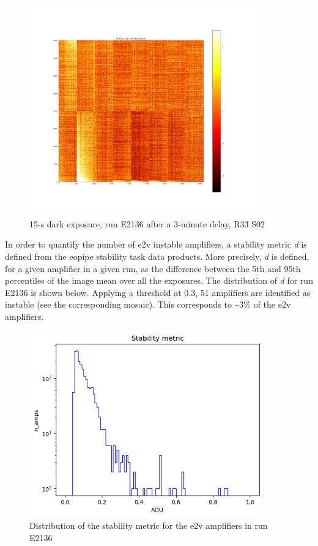 \begin{figure}
\begin{centering}
\includegraphics[width=0.9\textwidth]{sections/figures/E2136_dark15_delay_R33_S02.png}
\end{centering}
\caption{15-s dark exposure, run E2136 after a 3-minute delay, R33 S02}
\end{figure}

In order to quantify the number of e2v instable amplifiers, a stability
metric \emph{d} is defined from the eo\label{pipe}{pipe}
stability task data products. More precisely, \emph{d} is defined, for a
given amplifier in a given run, as the difference between the 5th and
95th percentiles of the image mean over all the exposures. The
distribution of \emph{d} for run E2136 is shown below. Applying a
threshold at 0.3, 51 amplifiers are identified as instable (see the
corresponding mosaic). This corresponds to \textasciitilde3\% of the e2v
amplifiers.

\begin{figure}
\begin{centering}
\includegraphics[width=0.9\textwidth]{sections/figures/E2136_distribution_d.png}
\end{centering}
\caption{Distribution of the stability metric for the e2v amplifiers in
run E2136}
\end{figure}

